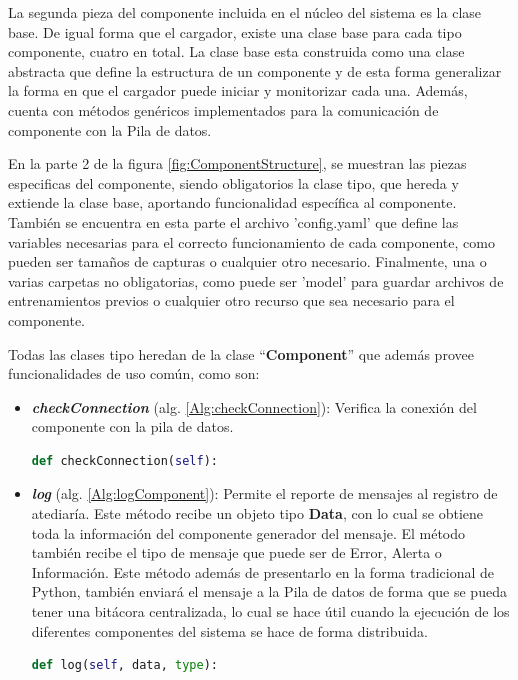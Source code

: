     La segunda pieza del componente incluida en el núcleo del sistema es la clase base. De igual forma que el cargador, existe una clase base para cada tipo componente, cuatro en total. La clase base esta construida como una clase abstracta que define la estructura de un componente y de esta forma generalizar la forma en que el cargador puede iniciar y monitorizar cada una. Además, cuenta con métodos genéricos implementados para la comunicación de componente con la Pila de datos.
    
    En la parte 2 de la figura \ref{fig:ComponentStructure}, se muestran las piezas especificas del componente, siendo obligatorios la clase tipo, que hereda y extiende la clase base, aportando funcionalidad específica al componente. También se encuentra en esta parte el archivo 'config.yaml' que define las variables necesarias para el correcto funcionamiento de cada componente, como pueden ser tamaños de capturas o cualquier otro necesario. Finalmente, una o varias carpetas no obligatorias, como  puede ser 'model' para guardar archivos de entrenamientos previos o cualquier otro recurso que sea necesario para el componente.
    
    Todas las clases tipo heredan de la clase ``\textbf{Component}'' que además provee funcionalidades de uso común, como son:
    
    \begin{itemize}
    
            \item \textbf{\textit{checkConnection}} (alg. \ref{Alg:checkConnection}):
            Verifica la conexión del componente con la pila de datos.
            \begin{lstlisting}[language=Python, caption={Firma del método ``\textit{checkConnection}''.}, label=Alg:checkConnection, numbers=none]
def checkConnection(self):
            \end{lstlisting}
        
            \item \textbf{\textit{log}} (alg. \ref{Alg:logComponent}):
            Permite el reporte de mensajes al registro de atediaría. Este método recibe un objeto tipo \textbf{Data}, con lo cual se obtiene toda la información del componente generador del mensaje. El método también recibe el tipo de mensaje que puede ser de Error, Alerta o Información. Este método además de presentarlo en la forma tradicional de Python, también enviará el mensaje a la Pila de datos de forma que se pueda tener una bitácora centralizada, lo cual se hace útil cuando la ejecución de los diferentes componentes del sistema se hace de forma distribuida.
            \begin{lstlisting}[language=Python, caption={Firma del método ``\textit{log}''.}, label=Alg:logComponent, numbers=none]
def log(self, data, type):
            \end{lstlisting}
        
        \end{itemize}
        
